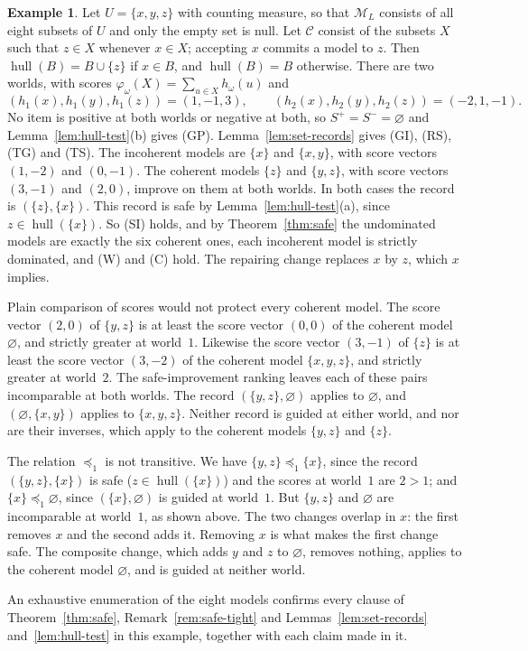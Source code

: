 \documentclass[11pt]{article}
\theoremstyle{definition}
\newtheorem{example}[theorem]{Example}
\theoremstyle{remark}
\newcommand{\M}{\mathcal M}
\newcommand{\C}{\mathcal C}
\newcommand{\hull}{\operatorname{hull}}
\begin{document}
\begin{example}\label{ex:safe}
Let $U=\{x,y,z\}$ with counting measure, so that $\M_L$ consists of all eight subsets of $U$ and only the empty set is null. Let $\C$ consist of the subsets $X$ such that $z\in X$ whenever $x\in X$; accepting $x$ commits a model to $z$. Then $\hull(B)=B\cup\{z\}$ if $x\in B$, and $\hull(B)=B$ otherwise. There are two worlds, with scores $\varphi_\omega(X)=\sum_{u\in X}h_\omega(u)$ and
\[
 (h_1(x),h_1(y),h_1(z))=(1,-1,3),\qquad (h_2(x),h_2(y),h_2(z))=(-2,1,-1).
\]
No item is positive at both worlds or negative at both, so $S^+=S^-=\varnothing$ and Lemma~\ref{lem:hull-test}(b) gives (GP). Lemma~\ref{lem:set-records} gives (GI), (RS), (TG) and (TS). The incoherent models are $\{x\}$ and $\{x,y\}$, with score vectors $(1,-2)$ and $(0,-1)$. The coherent models $\{z\}$ and $\{y,z\}$, with score vectors $(3,-1)$ and $(2,0)$, improve on them at both worlds. In both cases the record is $(\{z\},\{x\})$. This record is safe by Lemma~\ref{lem:hull-test}(a), since $z\in\hull(\{x\})$. So (SI) holds, and by Theorem~\ref{thm:safe} the undominated models are exactly the six coherent ones, each incoherent model is strictly dominated, and (W) and (C) hold. The repairing change replaces $x$ by $z$, which $x$ implies.

Plain comparison of scores would not protect every coherent model. The score vector $(2,0)$ of $\{y,z\}$ is at least the score vector $(0,0)$ of the coherent model $\varnothing$, and strictly greater at world~$1$. Likewise the score vector $(3,-1)$ of $\{z\}$ is at least the score vector $(3,-2)$ of the coherent model $\{x,y,z\}$, and strictly greater at world~$2$. The safe-improvement ranking leaves each of these pairs incomparable at both worlds. The record $(\{y,z\},\varnothing)$ applies to $\varnothing$, and $(\varnothing,\{x,y\})$ applies to $\{x,y,z\}$. Neither record is guided at either world, and nor are their inverses, which apply to the coherent models $\{y,z\}$ and $\{z\}$.

The relation $\preceq_1$ is not transitive. We have $\{y,z\}\preceq_1\{x\}$, since the record $(\{y,z\},\{x\})$ is safe ($z\in\hull(\{x\})$) and the scores at world~$1$ are $2>1$; and $\{x\}\preceq_1\varnothing$, since $(\{x\},\varnothing)$ is guided at world~$1$. But $\{y,z\}$ and $\varnothing$ are incomparable at world~$1$, as shown above. The two changes overlap in $x$: the first removes $x$ and the second adds it. Removing $x$ is what makes the first change safe. The composite change, which adds $y$ and $z$ to $\varnothing$, removes nothing, applies to the coherent model $\varnothing$, and is guided at neither world.
\end{example}
An exhaustive enumeration of the eight models confirms every clause of Theorem~\ref{thm:safe}, Remark~\ref{rem:safe-tight} and Lemmas~\ref{lem:set-records} and~\ref{lem:hull-test} in this example, together with each claim made in it.
\end{document}
